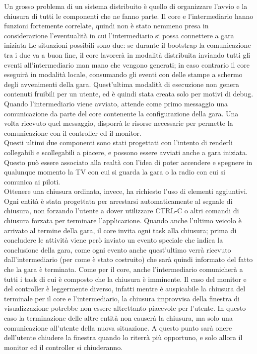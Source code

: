 Un grosso problema di un sistema distribuito è quello di organizzare l’avvio e la chiusura di tutti le componenti che ne fanno parte.
Il core e l’intermediario hanno funzioni fortemente correlate, quindi non è stato nemmeno presa in considerazione l’eventualità in cui l’intermediario si possa connettere a gara iniziata
Le situazioni possibili sono due: se durante il bootstrap la comunicazione tra i due va a buon fine, il core lavorerà in modalità distribuita inviando tutti gli eventi all’intermediario man mano che vengono generati; in caso contrario il core eseguirà in modalità locale, consumando gli eventi con delle stampe a schermo degli avvenimenti della gara. Quest’ultima modalità di esecuzione non genera contenuti fruibili per un utente, ed è quindi stata creata solo per motivi di debug. \\
Quando l’intermediario viene avviato, attende come primo messaggio una comunicazione da parte del core contenente la configurazione della gara. Una volta ricevuto quel messaggio, disporrà le risorse necessarie per permette la comunicazione con il controller ed il monitor. \\
Questi ultimi due componenti sono stati progettati con l’intento di renderli collegabili e scollegabili a piacere, e possono essere avviati anche a gara iniziata. Questo può essere associato alla realtà con l’idea di poter accendere e spegnere in qualunque momento la TV con cui si guarda la gara o la radio con cui si comunica ai piloti. \\
Ottenere una chiusura ordinata, invece, ha richiesto l’uso di elementi aggiuntivi. Ogni entità è stata progettata per arrestarsi automaticamente al segnale di chiusura, non forzando l’utente a dover utilizzare CTRL-C o altri comandi di chiusura forzata per terminare l’applicazione.
Quando anche l’ultimo veicolo è arrivato al termine della gara, il core invita ogni task alla chiusura; prima di concludere le attività viene però inviato un evento speciale che indica la conclusione della gara, come ogni evento anche quest’ultimo verrà ricevuto dall’intermediario (per come è stato costruito) che sarà quindi informato del fatto che la gara è terminata. Come per il core, anche l’intermediario comunicherà a tutti i task di cui è composto che la chiusura è imminente.
Il caso del monitor e del controller è leggermente diverso, infatti mentre è auspicabile la chiusura del terminale per il core e l’intermediario, la chiusura improvvisa della finestra di visualizzazione potrebbe non essere altrettanto piacevole per l’utente. In questo caso la terminazione delle altre entità non causerà la chiusura, ma solo una comunicazione all’utente della nuova situazione. A questo punto sarà onere dell’utente chiudere la finestra quando lo riterrà più opportuno, e solo allora il monitor ed il controller si chiuderanno.
